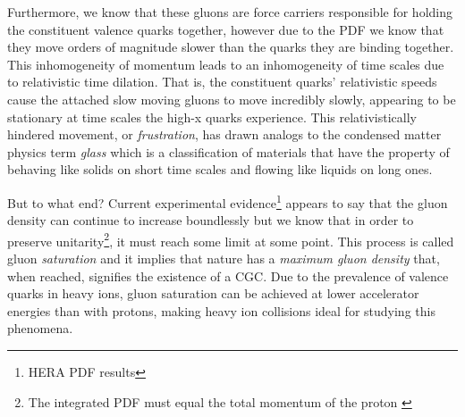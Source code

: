 Furthermore, we know that these gluons are force carriers responsible for holding the constituent valence quarks together, however due to the PDF we know that they move orders of magnitude slower than the quarks they are binding together. This inhomogeneity of momentum leads to an inhomogeneity of time scales due to relativistic time dilation. That is, the constituent quarks' relativistic speeds cause the attached slow moving gluons to move incredibly slowly, appearing to be stationary at time scales the high-x quarks experience. This relativistically hindered movement, or \textit{frustration}, has drawn analogs to the condensed matter physics term \textit{glass} which is a classification of materials that have the property of behaving like solids on short time scales and flowing like liquids on long ones. 

But to what end? Current experimental evidence\footnote{HERA PDF results} appears to say that the gluon density can continue to increase boundlessly but we know that in order to preserve unitarity\footnote{The integrated PDF must equal the total momentum of the proton \citep{HemmickRHIClecture}}, it must reach some limit at some point. This process is called gluon \textit{saturation} and it implies that nature has a \textit{maximum gluon density} that, when reached, signifies the existence of a CGC\citep{HemmickRHIClecture}. Due to the prevalence of valence quarks in heavy ions, gluon saturation can be achieved at lower accelerator energies than with protons, making heavy ion collisions ideal for studying this phenomena.

